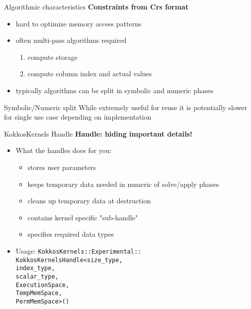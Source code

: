 \begin{frame}[fragile]{Algorithmic characteristics}
\textbf{Constraints from Crs format}

\begin{itemize}
\item hard to optimize memory access patterns
\item often multi-pass algorithms required
  \begin{enumerate}
  \item compute storage
  \item compute column index and actual values
  \end{enumerate}
\item typically algorithms can be split in symbolic and numeric phases
\end{itemize}

\begin{block}{Symbolic/Numeric split}
  While extremely useful for reuse it is potentially slower for single use case depending on implementation
\end{block}
\end{frame}

\begin{frame}[fragile]{KokkosKernels Handle}
\textbf{Handle: hiding important details!}

\begin{itemize}
\item What the handles does for you:
  \begin{itemize}
  \item stores user parameters
  \item keeps temporary data needed in numeric of solve/apply phases
  \item cleans up temporary data at destruction
  \item contains kernel specific "sub-handle"
  \item specifies required data types
  \end{itemize}

\item Usage: \texttt{KokkosKernels::Experimental::\\ KokkosKernelsHandle<size\_type,\\
  \hspace{3.8cm} index\_type,\\
  \hspace{3.8cm} scalar\_type,\\
  \hspace{3.8cm} ExecutionSpace,\\
  \hspace{3.8cm} TempMemSpace,\\
  \hspace{3.8cm} PermMemSpace>()}
\end{itemize}
\end{frame}

